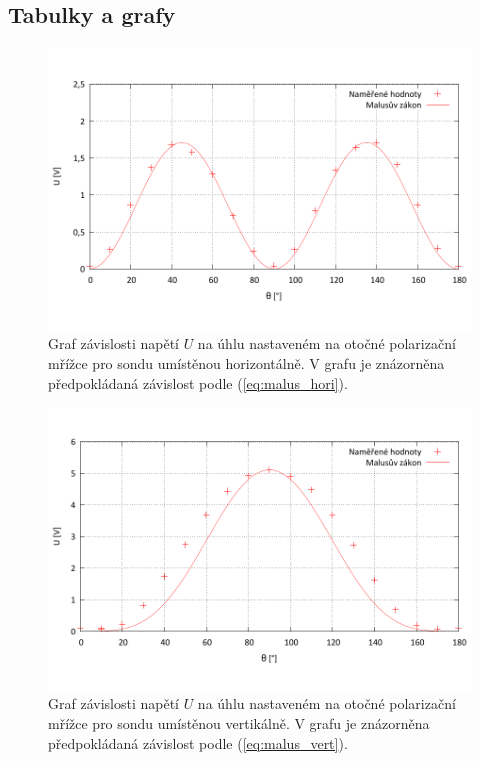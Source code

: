 \documentclass[english]{article}
\begin{document}
\clearpage
\subsection{Tabulky a grafy}

	\begin{figure}[h!]
	\begin{center}
	    \vspace*{-1cm}
		\includegraphics[width=\linewidth]{../gnuplot/1_mallus_hori.pdf}
	    \vspace*{-2cm}
		\caption{Graf závislosti napětí $U$ na úhlu nastaveném na otočné polarizační mřížce pro sondu umístěnou horizontálně. V grafu je znázorněna předpokládaná závislost podle (\ref{eq:malus_hori}).}
		\label{fig:g_mallus_hori}
	\end{center}
	\end{figure}	
	
	\begin{figure}[h!]
	\begin{center}
	    \vspace*{-1cm}
		\includegraphics[width=\linewidth]{../gnuplot/1_mallus_vert.pdf}
	    \vspace*{-2cm}
		\caption{Graf závislosti napětí $U$ na úhlu nastaveném na otočné polarizační mřížce pro sondu umístěnou vertikálně. V grafu je znázorněna předpokládaná závislost podle (\ref{eq:malus_vert}).}
		\label{fig:g_mallus_vert}
	\end{center}
	\end{figure}	
	
\end{document}

